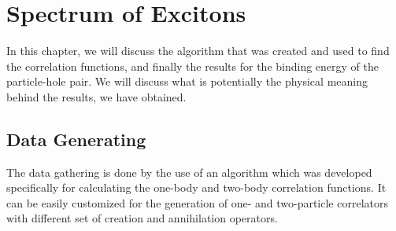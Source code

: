 
\chapter{Spectrum of Excitons}
\label{sec:excitons}
In this chapter, we will discuss the algorithm that was created and used to find the correlation functions, and finally the results for the binding energy of the particle-hole pair. We will discuss what is potentially the physical meaning behind the results, we have obtained.

\section{Data Generating}

The data gathering is done by the use of an algorithm which was developed specifically for calculating the one-body and two-body correlation functions. It can be easily customized for the generation of one- and two-particle correlators with different set of creation and annihilation operators.


